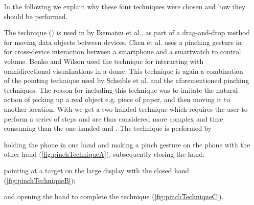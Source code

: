 In the following we explain why these four techniques were chosen and how they should be performed.

The \pinch technique () is used in \cite{Ikematsu:2015} by Ikematsu et al., as part of a drag-and-drop method for moving data objects between devices.
Chen et al. uses a pinching gesture in \cite{Chen:2014} for cross-device interaction between a smartphone and a smartwatch to control volume. 
Benko and Wilson \cite{Benko:2010} used the \pinch technique for interacting with omnidirectional visualizations in a dome.
This technique is again a combination of the pointing technique used by Scheible et al. \cite{Scheible:2008} and the aforementioned pinching techniques. 
The reason for including this technique was to imitate the natural action of picking up a real object e.g. piece of paper, and then moving it to another location.
With \pinch we get a two handed technique which requires the user to perform a series of steps and are thus considered more complex and time consuming  than the one handed \swipe and \tilt.
The \pinch technique is performed by 
\begin{enumerate*}[label=\itshape\roman*\upshape)]
	\item{holding the phone in one hand and making a pinch gesture on the phone with the other hand (\cref{fig:pinchTechniqueA}), subsequently closing the hand;}
	\item{pointing at a target on the large display with the closed hand (\cref{fig:pinchTechniqueB});}
	\item{and opening the hand to complete the technique (\cref{fig:pinchTechniqueC}).}
\end{enumerate*}

